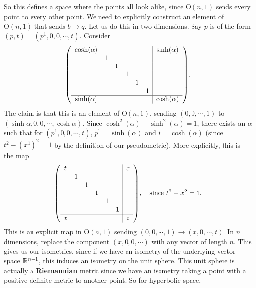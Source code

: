 So this defines a space where the points all look alike, since $\mathrm O(n,1)$ sends every point to every other point. We need to explicitly construct an element of $\mathrm O(n,1)$ that sends $b \to q$. Let us do this in two dimensions. Say $p$ is of the form $(p,t)=(p^1,0,0,\cdots,t)$. Consider \[
\mleft(\begin{array}{cccccc|c}
    \cosh(\alpha )& & & & & & \sinh(\alpha ) \\
    & 1 & & & & & \\
    & & 1&  & & & \\
    & & & 1 & & & \\
    & & &  & 1& & \\
    & & &  & & 1& \\
    \hline
    \sinh(\alpha )&  & &  & & & \cosh(\alpha )
\end{array}\mright).
\] The claim is that this is an element of $\mathrm O(n,1)$, sending  $(0,0,\cdots ,1)$ to $(\sinh\alpha ,0,0,\cdots ,\cosh\alpha )$. Since $\cosh^2(\alpha )-\sinh^2(\alpha )=1$, there exists an $\alpha $ such that for $(p^1,0,0,\cdots ,t) $, $p^1=\sinh(\alpha )$ and $t=\cosh(\alpha )$ (since $t^2-(x^1)^2=1$ by the definition of our pseudometric). More explicitly, this is the map \[
\mleft(\begin{array}{cccccc|c}
    t& & & & & & x \\
    & 1 & & & & & \\
    & & 1&  & & & \\
    & & & 1 & & & \\
    & & &  & 1& & \\
    & & &  & & 1& \\
    \hline
    x&  & &  & & & t
\end{array}\mright), \quad \text{since} \ t^2-x^2=1.
\] This is an explicit map in $\mathrm O(n,1)$ sending $(0,0,\cdots ,1)\to (x,0,\cdots ,t)$. In $n$ dimensions, replace the component $(x,0,0,\cdots )$ with any vector of length $n$. This gives us our isometries, since if we have an isometry of the underlying vector space $\mathbb{R}^{n+1}$, this induces an isometry on the unit sphere. This unit sphere is actually a \textbf{Riemannian} metric since we have an isometry taking a point with a positive definite metric to another point. So for hyperbolic space,
